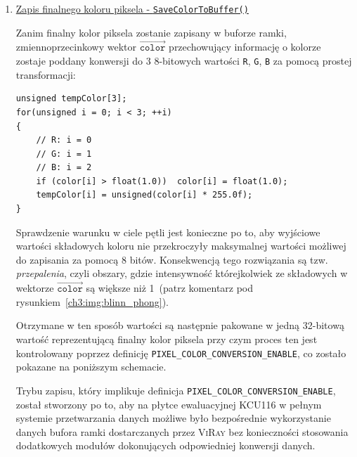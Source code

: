 \begin{enumerate}
\item \underline{Zapis finalnego koloru piksela - \texttt{SaveColorToBuffer()}}

Zanim finalny kolor piksela zostanie zapisany w buforze ramki, zmiennoprzecinkowy wektor $\mathtt{\overrightarrow{color}}$ przechowujący informację o kolorze zostaje poddany konwersji do 3 8-bitowych wartości \texttt{R}, \texttt{G}, \texttt{B} za pomocą prostej transformacji:

\begin{lstlisting}
unsigned tempColor[3];
for(unsigned i = 0; i < 3; ++i)
{
	// R: i = 0
	// G: i = 1
	// B: i = 2
	if (color[i] > float(1.0))	color[i] = float(1.0);
	tempColor[i] = unsigned(color[i] * 255.0f);
}
\end{lstlisting}
Sprawdzenie warunku w ciele pętli jest konieczne po to, aby wyjściowe wartości składowych koloru nie przekroczyły maksymalnej wartości możliwej do zapisania za pomocą 8 bitów. Konsekwencją tego rozwiązania są tzw. \textit{przepalenia}, czyli obszary, gdzie intensywność którejkolwiek ze składowych w wektorze $\mathtt{\overrightarrow{color}}$ są większe niż 1~(patrz komentarz pod rysunkiem~\ref{ch3:img:blinn_phong}).

Otrzymane w ten sposób wartości są następnie pakowane w jedną 32-bitową wartość reprezentującą finalny kolor piksela przy czym proces ten jest kontrolowany poprzez definicję \texttt{PIXEL\_COLOR\_CONVERSION\_ENABLE}, co zostało pokazane na poniższym schemacie.


Trybu zapisu, który implikuje definicja \texttt{PIXEL\_COLOR\_CONVERSION\_ENABLE}, został stworzony po to, aby na płytce ewaluacyjnej KCU116 w pełnym systemie przetwarzania danych możliwe było bezpośrednie wykorzystanie danych bufora ramki dostarczanych przez \textsc{ViRay} bez konieczności stosowania dodatkowych modułów dokonujących odpowiedniej konwersji danych.


\end{enumerate}
